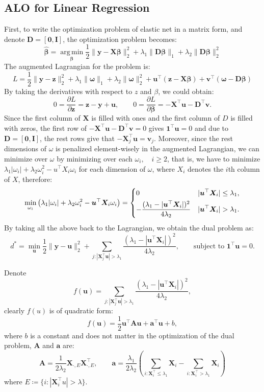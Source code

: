 \documentclass[11pt]{article}
\newcommand{\ba}{\bm{a}}
\newcommand{\bu}{\bm{u}}
\newcommand{\bv}{\bm{v}}
\newcommand{\by}{\bm{y}}
\newcommand{\bz}{\bm{z}}
\newcommand{\bA}{\bm{A}}
\newcommand{\bD}{\bm{D}}
\newcommand{\bI}{\bm{I}}
\newcommand{\bX}{\bm{X}}
\newcommand{\bbeta}{\bm{\beta}}
\newcommand{\bZero}{\bm{0}}
\newcommand{\bOne}{\bm{1}}
\DeclareMathOperator*{\argmin}{arg\,min}
\begin{document}
\subsection{ALO for Linear Regression}
First, to write the optimization problem of elastic net in a matrix form, and denote $\bD =[\bm0, \bI]$, the optimization problem becomes: \[\hat{\bbeta} = \argmin\limits_{\bbeta} \frac{1}{2}\|\by-\bX\bbeta\|_{2}^{2} + \lambda_{1}\|\bD\bbeta\|_{1}+\lambda_{2}\|\bD\bbeta\|_{2}^{2}\] The augmented Lagrangian for the problem is: \[L = \frac{1}{2}\|\by-\bz\|_{2}^{2} + \lambda_{1}\|\bm{\omega}\|_{1}+\lambda_{2}\|\bm{\omega}\|_{2}^{2} +\bu^{\top}(\bz-\bX\bbeta) +\bm{v}^{\top}(\bm{\omega}-\bD\bbeta)\] By taking the derivatives with respect to $z$ and $\beta$, we could obtain: \[0 = \frac{\partial L}{\partial \bz} = \bz-\by+\bu,\qquad0 = \frac{\partial L}{\partial \bbeta} = -\bX^{\top}\bu-\bD^{\top}\bv.\]
Since the first column of $\bX$ is filled with ones and the first column of $D$ is filled with zeros, the first row of $-\bX^{\top}\bu-\bD^{\top}\bv = 0$ gives $\bOne^{\top}\bu = 0$ and due to $\bD = [\bZero,\bI]$, the rest rows give that $-\bX_{j}^{\top}\bu = \bv_{j}$. Moreover, since the rest dimensions of $\omega$ is penalized element-wisely in the augmented Lagrangian, we can minimize over $\omega$ by minimizing over each $\omega_{i}, \quad i \geq 2$, that is, we have to minimize $\lambda_{1}|\omega_{i}| + \lambda_{2}\omega_{i}^{2} - u^{\top}X_{i}\omega_{i}$ for each dimension of $\omega$, where $X_{i}$ denotes the $i$th column of $X$, therefore: \[\min\limits_{\omega_i}\left(\lambda_{1}|\omega_{i}| + \lambda_{2}\omega_{i}^{2} - \bu^{\top}\bX_{i}\omega_i\right)=\begin{dcases}
0 & |\bu^{\top}\bX_{i}| \leq \lambda_{1},\\
-\frac{(\lambda_{1}-|\bu^{\top}\bX_{i}|)^{2}}{4\lambda_{2}} & |\bu^{\top}\bX_{i}| > \lambda_{1}.
\end{dcases}\]
By taking all the above back to the Lagrangian, we obtain the dual problem as: \[d^{*} = \min\limits_{\bu}\frac{1}{2}\|\by-\bu\|_{2}^{2} + \sum_{j: |\bX_{j}^{\top}\bu| > \lambda_{1}}\frac{(\lambda_{1}-|\bu^{\top}\bX_{i}|)^{2}}{4\lambda_{2}},\qquad\text{subject to }\bOne^\top\bu=0.\]

Denote \[f(\bu) = \sum\limits_{j: |\bX_{j}^{\top}\bu| > \lambda_{1}}\frac{(\lambda_{1}-|\bu^{\top}\bX_{i}|)^{2}}{4\lambda_{2}},\] clearly $f(u)$ is of quadratic form: \[f(\bu) = \frac{1}{2}\bu^{\top}\bA\bu+\ba^{\top}\bu+b,\] where $b$ is a constant and does not matter in the optimization of the dual problem, $\bA$ and $\ba$ are: \[\bA = \frac{1}{2\lambda_{2}}\bX_{\cdot, E}\bX_{\cdot, E}^{\top},\qquad \ba = \frac{\lambda_{1}}{2\lambda_{2}}(\sum\limits_{i:\bX_{i}^{\top}\leq \lambda_{1}}\bX_{i}-\sum\limits_{i:\bX_{i}^{\top}>\lambda_{1}}\bX_{i})\] where \(E\coloneqq\{i: |\bX_{i}^{\top}u| > \lambda \}\).
\end{document}
